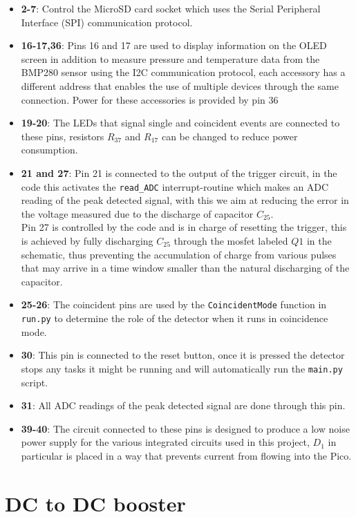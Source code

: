 \begin{itemize}
    \item \textbf{2-7}: Control the MicroSD card socket which uses the Serial Peripheral Interface (SPI) communication protocol.
    \item \textbf{16-17,36}: Pins 16 and 17 are used to display information on the OLED screen in addition to measure pressure and temperature data from the BMP280 sensor using the I2C communication protocol, each accessory has a different address that enables the use of multiple devices through the same connection. Power for these accessories is provided by pin 36
    \item \textbf{19-20}: The LEDs that signal single and coincident events are connected to these pins, resistors $R_{37}$ and $R_{17}$ can be changed to reduce power consumption.
    \item \textbf{21 and 27}: Pin 21 is connected to the output of the trigger circuit, in the code this activates the \texttt{read\_ADC} interrupt-routine which makes an ADC reading of the peak detected signal, with this we aim at reducing the error in the voltage measured due to the discharge of capacitor $C_{25}$. \\Pin 27 is controlled by the code and is in charge of resetting the trigger, this is achieved by fully discharging $C_{25}$ through the mosfet labeled $Q1$ in the schematic, thus preventing the accumulation of charge from various pulses that may arrive in a time window smaller than the natural discharging of the capacitor.
    \item \textbf{25-26}: The coincident pins are used by the \texttt{CoincidentMode} function in \texttt{run.py} to determine the role of the detector when it runs in coincidence mode.
    \item \textbf{30}: This pin is connected to the reset button, once it is pressed the detector stops any tasks it might be running and will automatically run the \texttt{main.py} script.
    \item \textbf{31}: All ADC readings of the peak detected signal are done through this pin.
    \item \textbf{39-40}: The circuit connected to these pins is designed to produce a low noise power supply for the various integrated circuits used in this project, $D_1$ in particular is placed in a way that prevents current from flowing into the Pico.
\end{itemize}

\section{DC to DC booster} \label{sec:DC_DC}

